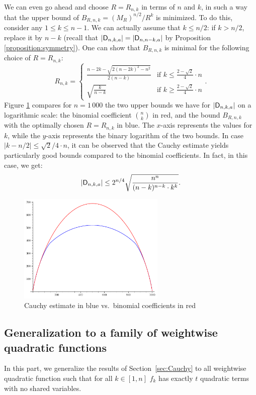 \documentclass[11pt]{llncs}
\begin{document}
{\begin{remark}
    We can even go ahead and choose $R=R_{n,k}$ in terms of $n$ and $k$, in such a way that the upper bound of $B_{R,n,k}=(M_R)^{n/2}/R^k$ is minimized. To do this, consider any $1\leq k\leq n-1$. We can actually assume that $k\leq n/2$: if $k>n/2$, replace it by $n-k$ (recall that $|\mathsf{D}_{n,k,a}|=|\mathsf{D}_{n,n-k,a}|$ by Proposition \ref{proposition:symmetry}). One can show that $B_{R,n,k}$ is minimal for the following choice of $R=R_{n,k}$:
    \[
        R_{n,k}=\begin{cases}
            \frac{n-2k-\sqrt{2(n-2k)^2-n^2}}{2(n-k)}&\text{if $k\leq\frac{2-\sqrt 2}{4}\cdot n$}\\
            \sqrt{\frac{k}{n-k}}&\text{if $k\geq\frac{2-\sqrt 2}{4}\cdot n$}
        \end{cases}.
    \]
    Figure \ref{fig:cauchy_estimate} compares for $n=1\,000$ the two upper bounds we have for $|\mathsf{D}_{n,k,a}|$ on a logarithmic scale: the binomial coefficient $\binom nk$ in red, and the bound $B_{R,n,k}$ with the optimally chosen $R=R_{n,k}$ in blue. The $x$-axis represents the values for $k$, while the $y$-axis represents the binary logarithm of the two bounds. In case $|k-n/2|\leq\sqrt{2}/4\cdot n$, it can be observed that the Cauchy estimate yields particularly good bounds compared to the binomial coefficients. In fact, in this case, we get:
    \[
        |\mathsf{D}_{n,k,a}|\leq 2^{n/4}\sqrt{\frac{n^n}{(n-k)^{n-k}\cdot k^k}}.
    \]
    \begin{figure}
        \centering
        \includegraphics[width=7cm]{cauchy_estimate.pdf}
        \caption{Cauchy estimate in blue vs.\ binomial coefficients in red}
        \label{fig:cauchy_estimate}
    \end{figure}
\end{remark}}




\subsection{Generalization to a family of weightwise quadratic functions}\label{sec:general}
In this part, we generalize the results of Section~\ref{sec:Cauchy} to all weightwise quadratic function such that for all $k\in [1,n]$ $f_k$ has exactly $t$ quadratic terms with no shared variables.
\end{document}
